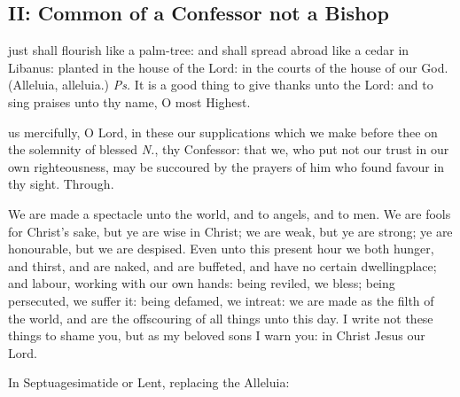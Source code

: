 \subsection{II: Common of a Confessor not a Bishop}\label{CommonConfessorNotBishopII}

\introit
{} just shall flourish like a palm-tree: and shall spread abroad like a cedar in Libanus: planted in the house of the Lord: in the courts of the house of our God. (Alleluia, alleluia.) \textit{Ps.} It is a good thing to give thanks unto the Lord: and to sing praises unto thy name, O most Highest.

\collect
{} us mercifully, O Lord, in these our supplications which we make before thee on the solemnity of blessed \textit{N.}, thy Confessor: that we, who put not our trust in our own righteousness, may be succoured by the prayers of him who found favour in thy sight. Through.

\label{CommonConfessorNotBishopIIEpistle}
 We are made a spectacle unto the world, and to angels, and to men. We are fools for Christ's sake, but ye are wise in Christ; we are weak, but ye are strong; ye are honourable, but we are despised. Even unto this present hour we both hunger, and thirst, and are naked, and are buffeted, and have no certain dwellingplace; and labour, working with our own hands: being reviled, we bless; being persecuted, we suffer it: being defamed, we intreat: we are made as the filth of the world, and are the offscouring of all things unto this day. I write not these things to shame you, but as my beloved sons I warn you: in Christ Jesus our Lord.


\begin{rubric}
{In Septuagesimatide or Lent, replacing the Alleluia:}
\end{rubric}

\vspace{-1ex}


